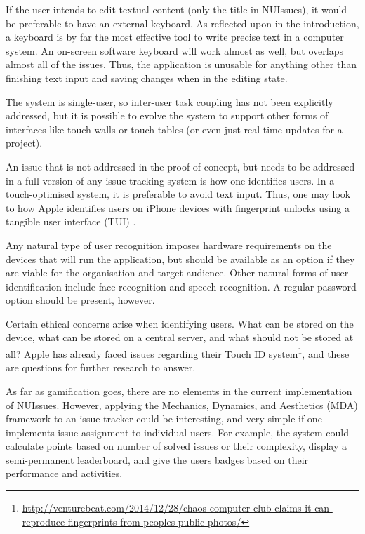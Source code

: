 If the user intends to edit textual content (only the title in NUIssues), it would be preferable to have an external keyboard. As reflected upon in the introduction, a keyboard is by far the most effective tool to write precise text in a computer system. An on-screen software keyboard will work almost as well, but overlaps almost all of the issues. Thus, the application is unusable for anything other than finishing text input and saving changes when in the editing state.

The system is single-user, so inter-user task coupling \autocite[39]{wigdow-wixon:brave-nui-world:2011} has not been explicitly addressed, but it is possible to evolve the system to support other forms of interfaces like touch walls or touch tables (or even just real-time updates for a project). 

An issue that is not addressed in the proof of concept, but needs to be addressed in a full version of any issue tracking system is how one identifies users. In a touch-optimised system, it is preferable to avoid text input. Thus, one may look to how Apple identifies users on iPhone devices with fingerprint unlocks using a tangible user interface (TUI) \autocite{ishii-ullmer:tangible-bits-towards-seamless-interfaces-between-people-bits-and-atoms:1997}.

Any natural type of user recognition imposes hardware requirements on the devices that will run the application, but should be available as an option if they are viable for the organisation and target audience. Other natural forms of user identification include face recognition and speech recognition. A regular password option should be present, however.

Certain ethical concerns arise when identifying users. What can be stored on the device, what can be stored on a central server, and what should not be stored at all? Apple has already faced issues regarding their Touch ID system\footnote{\url{http://venturebeat.com/2014/12/28/chaos-computer-club-claims-it-can-reproduce-fingerprints-from-peoples-public-photos/}}, and these are questions for further research to answer.

As far as gamification goes, there are no elements in the current implementation of NUIssues. However, applying the Mechanics, Dynamics, and Aesthetics (MDA) framework \parencite[107]{wigdow-wixon:brave-nui-world:2011} to an issue tracker could be interesting, and very simple if one implements issue assignment to individual users. For example, the system could calculate points based on number of solved issues or their complexity, display a semi-permanent leaderboard, and give the users badges based on their performance and activities.

